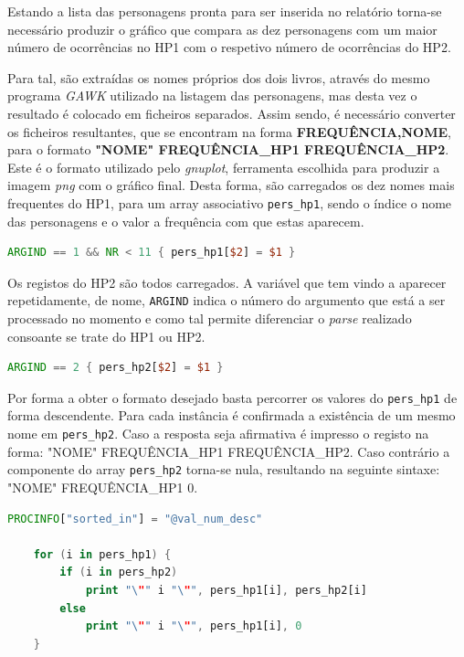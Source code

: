 \documentclass[a4paper]{article}
\begin{document}
\hspace{3mm} Estando a lista das personagens pronta para ser inserida no relatório torna-se necessário produzir o gráfico que compara as dez personagens com um maior número de ocorrências no HP1 com o respetivo número de ocorrências do HP2.

Para tal, são extraídas os nomes próprios dos dois livros, através do mesmo programa \textit{GAWK} utilizado na listagem das personagens, mas desta vez o resultado é colocado em ficheiros separados. Assim sendo, é necessário converter os ficheiros resultantes, que se encontram na forma \textbf{FREQUÊNCIA,NOME}, para o formato \textbf{"NOME" FREQUÊNCIA\_HP1 FREQUÊNCIA\_HP2}. Este é o formato utilizado pelo \textit{gnuplot}, ferramenta escolhida para produzir a imagem \textit{png} com o gráfico final. Desta forma, são carregados os dez nomes mais frequentes do HP1, para um array associativo \texttt{pers\_hp1}, sendo o índice o nome das personagens e o valor a frequência com que estas aparecem.

\begin{lstlisting}[language=Awk, caption=convert\_data.awk]
	ARGIND == 1 && NR < 11 { pers_hp1[$2] = $1 }
\end{lstlisting}

Os registos do HP2 são todos carregados. A variável que tem vindo a aparecer repetidamente, de nome, \texttt{ARGIND} indica o número do argumento que está a ser processado no momento e como tal permite diferenciar o \textit{parse} realizado consoante se trate do HP1 ou HP2.

\begin{lstlisting}[language=Awk, caption=convert\_data.awk]
	ARGIND == 2	{ pers_hp2[$2] = $1 }
\end{lstlisting}

Por forma a obter o formato desejado basta percorrer os valores do \texttt{pers\_hp1} de forma descendente. Para cada instância é confirmada a existência de um mesmo nome em \texttt{pers\_hp2}. Caso a resposta seja afirmativa é impresso o registo na forma: "NOME" FREQUÊNCIA\_HP1 FREQUÊNCIA\_HP2. Caso contrário a componente do array \texttt{pers\_hp2} torna-se nula, resultando na seguinte sintaxe: "NOME" FREQUÊNCIA\_HP1 0.

\begin{lstlisting}[language=Awk, caption=convert\_data.awk]
	PROCINFO["sorted_in"] = "@val_num_desc"

	for (i in pers_hp1) {
		if (i in pers_hp2)
			print "\"" i "\"", pers_hp1[i], pers_hp2[i]
		else
			print "\"" i "\"", pers_hp1[i], 0
	}
\end{lstlisting}
\end{document}
